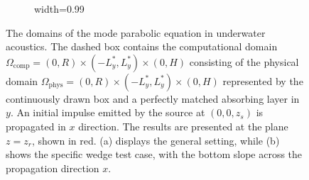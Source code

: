 \documentclass[11pt,a4paper]{article}
\theoremstyle{plain}%
\theoremstyle{definition}
\theoremstyle{remark}
\begin{document}
\begin{figure}[H]
\begin{subfigure}{0.49\linewidth}
\begin{adjustbox}{width=0.99\linewidth}
\begin{tikzpicture}[scale=2,tdplot_main_coords]
\end{tikzpicture}

        \end{adjustbox}
     \end{subfigure}
    \caption{The domains of the mode parabolic equation in underwater acoustics. 
    The dashed box contains the computational domain $\Omega_{\textrm{comp}}=(0,R)\times(-L_y^*, L_y^*)\times (0,H)$  consisting of the physical domain $\Omega_{\textrm{phys}}=(0,R)\times(-L_y^*, L_y^*)\times (0,H)$ represented by the continuously drawn box and a perfectly matched absorbing layer in $y$. 
    An initial impulse emitted by the source at $(0,0,z_s)$ is propagated in $x$ direction. 
    The results are presented at the plane $z=z_r$, shown in red.
    (a) displays the general setting, while (b) shows the specific wedge test case, with the bottom slope across the propagation direction $x$.}
    \label{fig:flat_bottom_schematic}
\end{figure}
\end{document}
